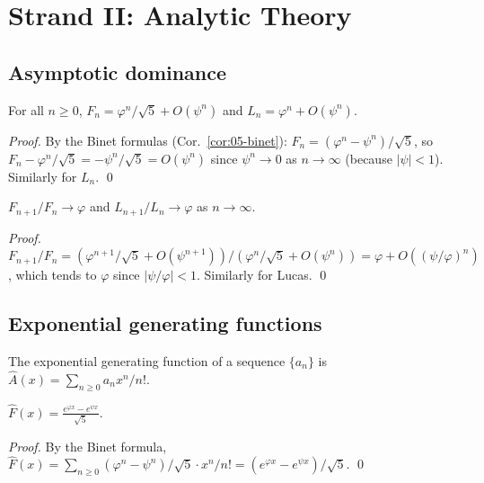 \section{Strand II: Analytic Theory}
\label{sec:05-strand-ii}

\subsection{Asymptotic dominance}

\begin{theorem}
\label{thm:05-asymptotic}
For all $n \ge 0$, $F_n = \varphi^n/\sqrt{5} + O(\psi^n)$ and $L_n = \varphi^n + O(\psi^n)$.
\end{theorem}

\begin{proof}
By the Binet formulas (Cor.~\ref{cor:05-binet}):
$F_n = (\varphi^n - \psi^n)/\sqrt{5}$, so $F_n - \varphi^n/\sqrt{5} = -\psi^n/\sqrt{5} = O(\psi^n)$
since $\psi^n \to 0$ as $n \to \infty$ (because $|\psi| < 1$). Similarly
for $L_n$. \qed
\end{proof}

\begin{corollary}
\label{cor:05-asymptotic-rate}
$F_{n+1}/F_n \to \varphi$ and $L_{n+1}/L_n \to \varphi$ as $n \to \infty$.
\end{corollary}

\begin{proof}
$F_{n+1}/F_n = (\varphi^{n+1}/\sqrt{5} + O(\psi^{n+1}))/(\varphi^n/\sqrt{5} + O(\psi^n))
= \varphi + O((\psi/\varphi)^n)$, which tends to $\varphi$ since
$|\psi/\varphi| < 1$. Similarly for Lucas. \qed
\end{proof}

\subsection{Exponential generating functions}

\begin{definition}
\label{fa_05:def:05-egf}
The exponential generating function of a sequence $\{a_n\}$ is
$\hat{A}(x) = \sum_{n \ge 0} a_n x^n / n!$.
\end{definition}

\begin{lemma}
\label{fa_05:lem:05-fib-egf}
$\hat{F}(x) = \frac{e^{\varphi x} - e^{\psi x}}{\sqrt{5}}$.
\end{lemma}

\begin{proof}
By the Binet formula, $\hat{F}(x) = \sum_{n \ge 0} (\varphi^n - \psi^n)/\sqrt{5} \cdot x^n/n! =
(e^{\varphi x} - e^{\psi x})/\sqrt{5}$. \qed
\end{proof}


